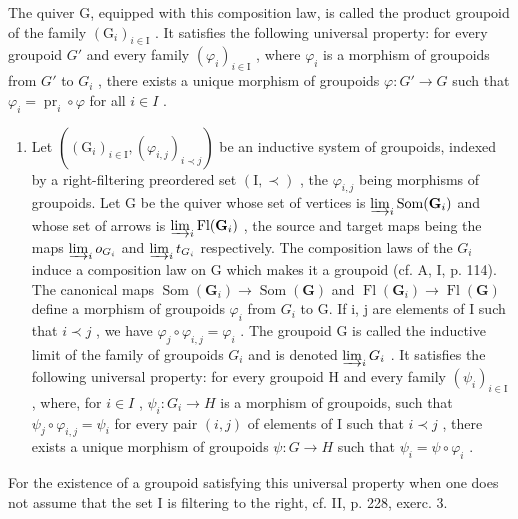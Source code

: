 The quiver G, equipped with this composition law, is called the product groupoid of the family \((\mathrm{G}_{i})_{i\in\mathrm{I}}\) . It satisfies the following universal property: for every groupoid \(G'\) and every family \((\varphi_{i})_{i\in\mathrm{I}}\) , where \(\varphi_{i}\) is a morphism of groupoids from \(G'\) to \(G_{i}\) , there exists a unique morphism of groupoids \(\varphi: G'\to G\) such that \(\varphi_{i}=\operatorname{pr}_{i}\circ\varphi\) for all \(i\in I\) .

\begin{enumerate}
\def\labelenumi{\arabic{enumi})}
\setcounter{enumi}{4}
\tightlist
\item
  Let \(((\mathrm{G}_{i})_{i\in\mathrm{I}},(\varphi_{i,j})_{i\prec j})\) be an inductive system of groupoids, indexed by a right-filtering preordered set \((\mathrm{I},\prec)\) , the \(\varphi_{i,j}\) being morphisms of groupoids. Let G be the quiver whose set of vertices is \(\varinjlim_{i}\operatorname{Som}(\mathbf{G}_{i})\) and whose set of arrows is \(\varinjlim_{i}\operatorname{Fl}(\mathbf{G}_{i})\) , the source and target maps being the maps \(\varinjlim_{i}o_{G_{i}}\) and \(\varinjlim_{i}t_{G_{i}}\) respectively. The composition laws of the \(G_{i}\) induce a composition law on G which makes it a groupoid (cf. A, I, p. 114). The canonical maps \(\operatorname{Som}(\mathbf{G}_{i})\to\operatorname{Som}(\mathbf{G})\) and \(\operatorname{Fl}(\mathbf{G}_{i})\to\operatorname{Fl}(\mathbf{G})\) define a morphism of groupoids \(\varphi_{i}\) from \(G_{i}\) to G. If i, j are elements of I such that \(i\prec j\) , we have \(\varphi_{j}\circ\varphi_{i,j}=\varphi_{i}\) . The groupoid G is called the inductive limit of the family of groupoids \(G_{i}\) and is denoted \(\varinjlim_{i}G_{i}\) . It satisfies the following universal property: for every groupoid H and every family \((\psi_{i})_{i\in\mathrm{I}}\) , where, for \(i\in I\) , \(\psi_{i}:G_{i}\to H\) is a morphism of groupoids, such that \(\psi_{j}\circ\varphi_{i,j}=\psi_{i}\) for every pair \((i,j)\) of elements of I such that \(i\prec j\) , there exists a unique morphism of groupoids \(\psi:G\to H\) such that \(\psi_{i}=\psi\circ\varphi_{i}\) .
\end{enumerate}

For the existence of a groupoid satisfying this universal property when one does not assume that the set I is filtering to the right, cf. II, p. 228, exerc. 3.
